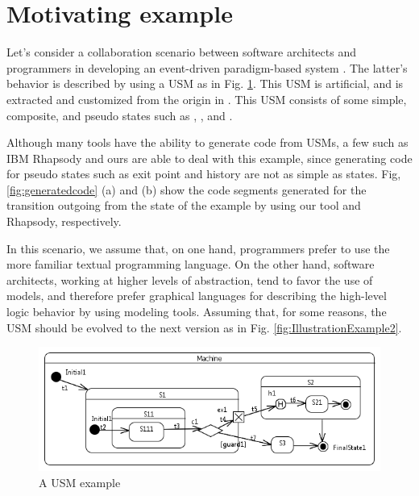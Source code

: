 \section{Motivating example}
\label{sec:motivation}
Let's consider a collaboration scenario between software architects and programmers in developing an event-driven paradigm-based system . The latter's behavior is described by using a USM as in Fig. \ref{fig:IllustrationExample1}.
This USM is artificial, and is extracted and customized from the origin in \cite{shuang_formalizing}.
This USM consists of some simple, composite, and pseudo states such as , , and .

Although many tools have the ability to generate code from USMs, a few such as IBM Rhapsody \cite{ibm_rhapsody} and ours are able to deal with this example, since generating code for pseudo states such as {exit point} and {history} are not as simple as states.
Fig, \ref{fig:generatedcode} (a) and (b) show the code segments generated for the transition outgoing from the state  of the example by using our tool and Rhapsody, respectively.

In this scenario, we assume that, on one hand, programmers prefer to
use the more familiar textual programming language. 
On the other hand, software architects, working at higher levels
of abstraction, tend to favor the use of models, and therefore
prefer graphical languages for describing the high-level logic behavior by using modeling tools.
Assuming that, for some reasons, the USM should be evolved to the next version as in Fig. \ref{fig:IllustrationExample2}.

\begin{figure}
	\centering
	\includegraphics[clip, trim=0.2cm 0.2cm 0.2cm 0.2cm, width=1.0\columnwidth]{figures/IllustrationExample1.png}
	\caption{A USM example} 
	\label{fig:IllustrationExample1}
\end{figure}

